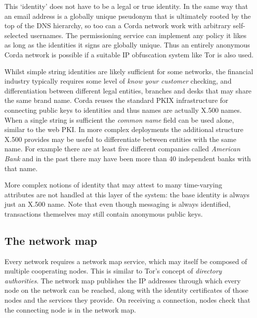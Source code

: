 \documentclass{article}
\begin{document}
This `identity' does not have to be a legal or true identity. In the same way that an email address is a globally
unique pseudonym that is ultimately rooted by the top of the DNS hierarchy, so too can a Corda network work with
arbitrary self-selected usernames. The permissioning service can implement any policy it likes as long as the
identities it signs are globally unique. Thus an entirely anonymous Corda network is possible if a suitable
IP obfuscation system like Tor\cite{Dingledine:2004:TSO:1251375.1251396} is also used.

Whilst simple string identities are likely sufficient for some networks, the financial industry typically requires some
level of \emph{know your customer} checking, and differentiation between different legal entities, branches and desks
that may share the same brand name. Corda reuses the standard PKIX infrastructure for connecting public keys to
identities and thus names are actually X.500 names. When a single string is sufficient the \emph{common name} field can
be used alone, similar to the web PKI. In more complex deployments the additional structure X.500 provides may be useful
to differentiate between entities with the same name. For example there are at least five different companies called
\emph{American Bank} and in the past there may have been more than 40 independent banks with that name.

More complex notions of identity that may attest to many time-varying attributes are not handled at this layer of the
system: the base identity is always just an X.500 name. Note that even though messaging is always identified, transactions
themselves may still contain anonymous public keys.


\subsection{The network map}

Every network requires a network map service, which may itself be composed of multiple cooperating nodes. This is
similar to Tor's concept of \emph{directory authorities}. The network map publishes the IP addresses through which
every node on the network can be reached, along with the identity certificates of those nodes and the services they
provide. On receiving a connection, nodes check that the connecting node is in the network map.
\end{document}

